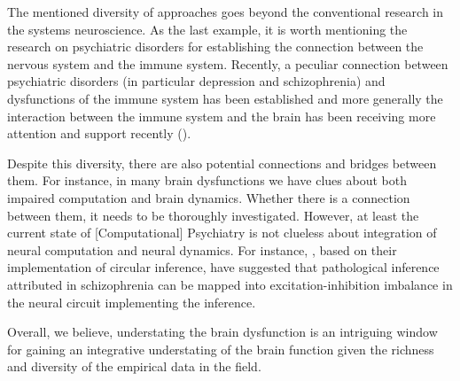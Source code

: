 The mentioned diversity of approaches goes beyond the conventional research in the systems neuroscience. 
As the last example, %
it is worth mentioning the research on psychiatric disorders for establishing the connection between the nervous system and the immune system. 
Recently, a peculiar connection between psychiatric disorders
(in particular depression and schizophrenia)
and dysfunctions of the immune system has been established 
\cite{khandakerInflammationImmunitySchizophrenia2015,bullmoreInflamedMindRadical2018,teixeiraImmunopsychiatryClinicianIntroduction2019,yuanInflammationrelatedBiomarkersMajor2019,mayerOptimalImmuneSystems2017,schillerNeuronalRegulationImmunity2020,haddadMaternalImmuneActivation2020,khandakerNeuroinflammationSchizophrenia2020}
and more generally the interaction between the immune system and the brain has been receiving more attention and support recently
(\cite{bullmoreInflamedMindRadical2018, deabreuPsychoneuroimmunologyImmunopsychiatryZebrafish2018,badimonNegativeFeedbackControl2020,pfeifferBrainImmuneCells2020,shieldsPsychosocialInterventionsImmune2020,mSocialIsolationAlters2020,heineTransdiagnosticHippocampalDamage2020,korenRememberingImmunityNeuronal2020,kolMemoryOrchestraRole2021}).


Despite this diversity, there are also potential connections and bridges between them.
For instance, in many brain dysfunctions we have clues about both impaired computation and  brain dynamics.
Whether there is a connection between them, it needs to be thoroughly investigated.
However, at least the current state of [Computational] Psychiatry
is not clueless about integration of neural computation and neural dynamics.
For instance, \cite{deneveCircularInferenceMistaken2016}, based on their implementation of circular inference, 
have suggested that pathological inference attributed in schizophrenia can be mapped into excitation-inhibition imbalance in the neural circuit implementing the inference.

Overall, we believe, understating the brain dysfunction is an intriguing window for gaining an integrative understating of the brain function given the richness and diversity of the empirical data in the field.




